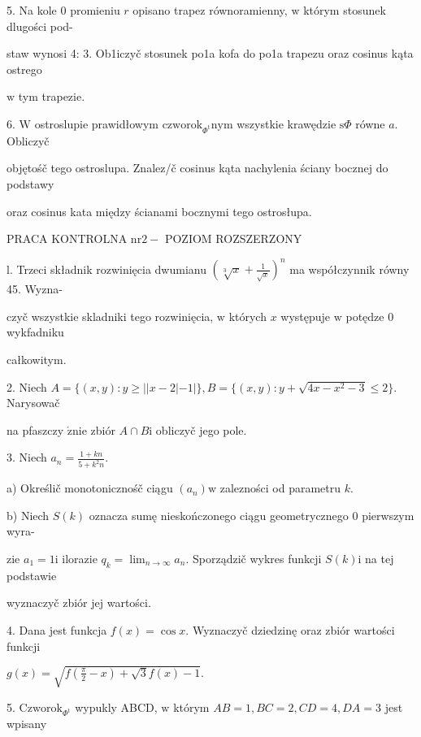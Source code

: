 \documentclass[a4paper,12pt]{article}
\begin{document}
5. Na kole $0$ promieniu $r$ opisano trapez równoramienny, $\mathrm{w}$ którym stosunek dlugości pod-

staw wynosi 4: 3. Ob1iczyč stosunek po1a kofa do po1a trapezu oraz cosinus kąta ostrego

$\mathrm{w}$ tym trapezie.

6. $\mathrm{W}$ ostroslupie prawidłowym $\mathrm{c}\mathrm{z}\mathrm{w}\mathrm{o}\mathrm{r}\mathrm{o}\mathrm{k}_{\Phi^{\mathrm{t}}}\mathrm{n}\mathrm{y}\mathrm{m}$ wszystkie krawędzie $\mathrm{s}\Phi$ równe $a$. Obliczyč

objętośč tego ostroslupa. Znalez/č cosinus kąta nachylenia ściany bocznej do podstawy

oraz cosinus kata między ścianami bocznymi tego ostrosłupa.





PRACA KONTROLNA $\mathrm{n}\mathrm{r}2-$ POZIOM ROZSZERZONY

l. Trzeci składnik rozwinięcia dwumianu $(\displaystyle \sqrt[3]{x}+\frac{1}{\sqrt{x}})^{n}$ ma współczynnik równy 45. Wyzna-

czyč wszystkie skladniki tego rozwinięcia, $\mathrm{w}$ których $x$ występuje $\mathrm{w}$ potędze $0$ wykfadniku

całkowitym.

2. Niech $A=\{(x,y):y\geq||x-2|-1|\}, B=\{(x,y):y+\sqrt{4x-x^{2}-3}\leq 2\}$. Narysowač

na pfaszczy $\acute{\mathrm{z}}\mathrm{n}\mathrm{i}\mathrm{e}$ zbiór $A\cap B\mathrm{i}$ obliczyč jego pole.

3. Niech $a_{n}=\displaystyle \frac{1+kn}{5+k^{2}n}.$

a) Określič monotonicznośč ciągu $(a_{n})\mathrm{w}$ zalezności od parametru $k.$

b) Niech $S(k)$ oznacza sumę nieskończonego ciągu geometrycznego $0$ pierwszym wyra-

zie $a_{1}=1 \mathrm{i}$ ilorazie $q_{k}=\displaystyle \lim_{n\rightarrow\infty}a_{n}$. Sporządzič wykres funkcji $S(k)\mathrm{i}$ na tej podstawie

wyznaczyč zbiór jej wartości.

4. Dana jest funkcja $f(x)=\cos x$. Wyznaczyč dziedzinę oraz zbiór wartości funkcji

$g(x)=\sqrt{f(\frac{\pi}{2}-x)+\sqrt{3}f(x)-1}.$

5. $\mathrm{C}\mathrm{z}\mathrm{w}\mathrm{o}\mathrm{r}\mathrm{o}\mathrm{k}_{\Phi^{\mathrm{t}}}$ wypukly ABCD, $\mathrm{w}$ którym $AB=1, BC=2, CD=4, DA=3$ jest wpisany
\end{document}
